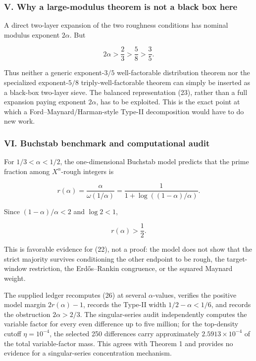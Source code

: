 \subsubsection*{V. Why a large-modulus theorem is not a black box here}

A direct two-layer expansion of the two roughness conditions has nominal modulus exponent \(2\alpha\). But

\[
2\alpha>\frac23>\frac58>\frac35.
\tag{25}
\]

Thus neither a generic exponent-\(3/5\) well-factorable distribution theorem nor the specialized exponent-\(5/8\) triply-well-factorable theorem can simply be inserted as a black-box two-layer sieve. The balanced representation (23), rather than a full expansion paying exponent \(2\alpha\), has to be exploited. This is the exact point at which a Ford--Maynard/Harman-style Type-II decomposition would have to do new work.

\subsubsection*{VI. Buchstab benchmark and computational audit}

For \(1/3<\alpha<1/2\), the one-dimensional Buchstab model predicts that the prime fraction among \(X^\alpha\)-rough integers is

\[
r(\alpha)
=
\frac{\alpha}{\omega(1/\alpha)}
=
\frac{1}{1+\log((1-\alpha)/\alpha)}.
\tag{26}
\]

Since \((1-\alpha)/\alpha<2\) and \(\log2<1\),

\[
r(\alpha)>\frac12.
\tag{27}
\]

This is favorable evidence for (22), not a proof: the model does not show that the strict majority survives conditioning the other endpoint to be rough, the target-window restriction, the Erdős--Rankin congruence, or the squared Maynard weight.

The supplied ledger recomputes (26) at several \(\alpha\)-values, verifies the positive model margin \(2r(\alpha)-1\), records the Type-II width \(1/2-\alpha<1/6\), and records the obstruction \(2\alpha>2/3\). The singular-series audit independently computes the variable factor for every even difference up to five million; for the top-density cutoff \(\eta=10^{-4}\), the selected 250 differences carry approximately \(2.5913\times10^{-4}\) of the total variable-factor mass. This agrees with Theorem 1 and provides no evidence for a singular-series concentration mechanism.

